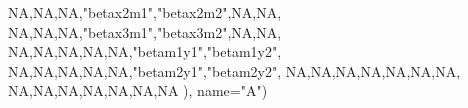 \documentclass[]{article}
\newenvironment{Shaded}{\begin{snugshade}}{\end{snugshade}}
\newcommand{\DataTypeTok}[1]{\textcolor[rgb]{0.13,0.29,0.53}{#1}}
\newcommand{\StringTok}[1]{\textcolor[rgb]{0.31,0.60,0.02}{#1}}
\newcommand{\OtherTok}[1]{\textcolor[rgb]{0.56,0.35,0.01}{#1}}
\newcommand{\NormalTok}[1]{#1}
\begin{document}
\begin{Shaded}
\begin{Highlighting}[]
                       \OtherTok{NA}\NormalTok{,}\OtherTok{NA}\NormalTok{,}\OtherTok{NA}\NormalTok{,}\StringTok{"betax2m1"}\NormalTok{,}\StringTok{"betax2m2"}\NormalTok{,}\OtherTok{NA}\NormalTok{,}\OtherTok{NA}\NormalTok{,}
                       \OtherTok{NA}\NormalTok{,}\OtherTok{NA}\NormalTok{,}\OtherTok{NA}\NormalTok{,}\StringTok{"betax3m1"}\NormalTok{,}\StringTok{"betax3m2"}\NormalTok{,}\OtherTok{NA}\NormalTok{,}\OtherTok{NA}\NormalTok{,}
                       \OtherTok{NA}\NormalTok{,}\OtherTok{NA}\NormalTok{,}\OtherTok{NA}\NormalTok{,}\OtherTok{NA}\NormalTok{,}\OtherTok{NA}\NormalTok{,}\StringTok{"betam1y1"}\NormalTok{,}\StringTok{"betam1y2"}\NormalTok{,}
                       \OtherTok{NA}\NormalTok{,}\OtherTok{NA}\NormalTok{,}\OtherTok{NA}\NormalTok{,}\OtherTok{NA}\NormalTok{,}\OtherTok{NA}\NormalTok{,}\StringTok{"betam2y1"}\NormalTok{,}\StringTok{"betam2y2"}\NormalTok{,}
                       \OtherTok{NA}\NormalTok{,}\OtherTok{NA}\NormalTok{,}\OtherTok{NA}\NormalTok{,}\OtherTok{NA}\NormalTok{,}\OtherTok{NA}\NormalTok{,}\OtherTok{NA}\NormalTok{,}\OtherTok{NA}\NormalTok{,}
                       \OtherTok{NA}\NormalTok{,}\OtherTok{NA}\NormalTok{,}\OtherTok{NA}\NormalTok{,}\OtherTok{NA}\NormalTok{,}\OtherTok{NA}\NormalTok{,}\OtherTok{NA}\NormalTok{,}\OtherTok{NA}
\NormalTok{              ),}
              \DataTypeTok{name=}\StringTok{"A"}\NormalTok{)}


\end{Highlighting}
\end{Shaded}
\end{document}
